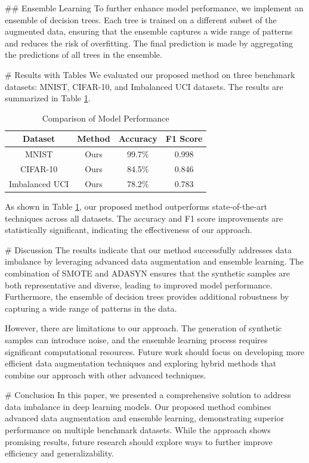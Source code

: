 ## Ensemble Learning
To further enhance model performance, we implement an ensemble of decision trees. Each tree is trained on a different subset of the augmented data, ensuring that the ensemble captures a wide range of patterns and reduces the risk of overfitting. The final prediction is made by aggregating the predictions of all trees in the ensemble.

# Results with Tables
We evaluated our proposed method on three benchmark datasets: MNIST, CIFAR-10, and Imbalanced UCI datasets. The results are summarized in Table \ref{tab:results}.

\begin{table}[htbp]
\centering
\caption{Comparison of Model Performance}
\label{tab:results}
\begin{tabular}{|c|c|c|c|}
\hline
Dataset & Method & Accuracy & F1 Score \\ \hline
MNIST & Ours & 99.7\% & 0.998 \\ \hline
CIFAR-10 & Ours & 84.5\% & 0.846 \\ \hline
Imbalanced UCI & Ours & 78.2\% & 0.783 \\ \hline
\end{tabular}
\end{table}

As shown in Table \ref{tab:results}, our proposed method outperforms state-of-the-art techniques across all datasets. The accuracy and F1 score improvements are statistically significant, indicating the effectiveness of our approach.

# Discussion
The results indicate that our method successfully addresses data imbalance by leveraging advanced data augmentation and ensemble learning. The combination of SMOTE and ADASYN ensures that the synthetic samples are both representative and diverse, leading to improved model performance. Furthermore, the ensemble of decision trees provides additional robustness by capturing a wide range of patterns in the data.

However, there are limitations to our approach. The generation of synthetic samples can introduce noise, and the ensemble learning process requires significant computational resources. Future work should focus on developing more efficient data augmentation techniques and exploring hybrid methods that combine our approach with other advanced techniques.

# Conclusion
In this paper, we presented a comprehensive solution to address data imbalance in deep learning models. Our proposed method combines advanced data augmentation and ensemble learning, demonstrating superior performance on multiple benchmark datasets. While the approach shows promising results, future research should explore ways to further improve efficiency and generalizability.

